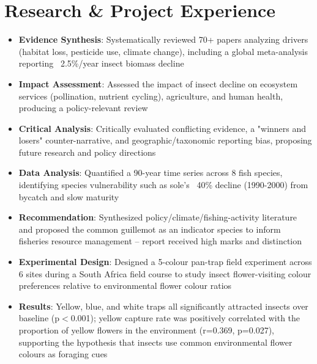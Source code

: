 \documentclass{my-resume}
\begin{document}
\section{Research \& Project Experience}

\begin{itemize}[parsep=0.2ex]
  \item \textbf{Evidence Synthesis}: Systematically reviewed 70+ papers analyzing drivers (habitat loss, pesticide use, climate change), including a global meta-analysis reporting ~2.5\%/year insect biomass decline
  \item \textbf{Impact Assessment}: Assessed the impact of insect decline on ecosystem services (pollination, nutrient cycling), agriculture, and human health, producing a policy-relevant review
  \item \textbf{Critical Analysis}: Critically evaluated conflicting evidence, a "winners and losers" counter-narrative, and geographic\slash taxonomic reporting bias, proposing future research and policy directions
\end{itemize}

\begin{itemize}[parsep=0.2ex]
  \item \textbf{Data Analysis}: Quantified a 90-year time series across 8 fish species, identifying species vulnerability such as sole's ~40\% decline (1990-2000) from bycatch and slow maturity
  \item \textbf{Recommendation}: Synthesized policy/climate/fishing-activity literature and proposed the common guillemot as an indicator species to inform fisheries resource management -- report received high marks and distinction
\end{itemize}

\begin{itemize}[parsep=0.2ex]
  \item \textbf{Experimental Design}: Designed a 5-colour pan-trap field experiment across 6 sites during a South Africa field course to study insect flower-visiting colour preferences relative to environmental flower colour ratios
  \item \textbf{Results}: Yellow, blue, and white traps all significantly attracted insects over baseline (p$<$0.001); yellow capture rate was positively correlated with the proportion of yellow flowers in the environment (r=0.369, p=0.027), supporting the hypothesis that insects use common environmental flower colours as foraging cues
\end{itemize}
\end{document}
